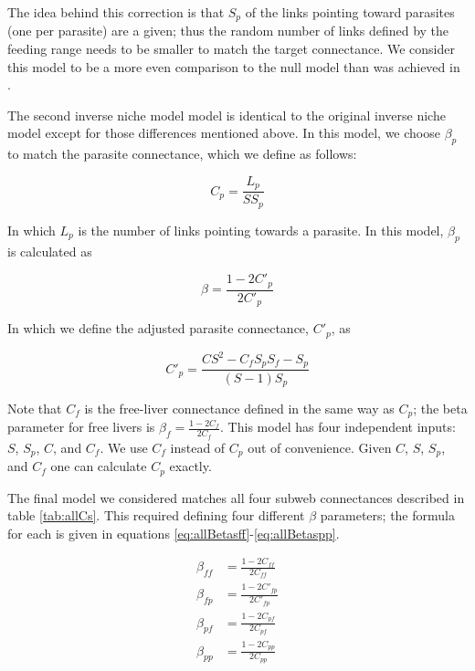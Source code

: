 \documentclass[/home/nkappler/Research/Dissertation/
 dissertation.tex]{subfiles}
\begin{document}
\begin{bibunit}
The idea behind this correction is that $S_p$ of the links pointing toward
parasites (one per parasite) are a given; thus the random number of links
defined by the feeding range needs to be smaller to match the target
connectance. We consider this model to be a more even comparison to the null
model than was achieved in \cite{Warren2010}.

The second inverse niche model model is identical to the original inverse niche
model except for those differences mentioned above. In this model, we choose
$\beta_p$ to match the parasite connectance, which we define as follows:

\begin{equation}
    C_{p} = \frac{L_{ p}}{SS_p}\label{eq:Cf}
\end{equation}

In which $L_{p}$ is the number of links pointing towards a parasite. In
this model, $\beta_p$ is calculated as

\begin{equation}
    \beta = \frac{1-2C'_{ p}}{2C'_{ p}}\label{eq:beta2}
\end{equation}

In which we define the adjusted parasite connectance, $C'_{ p}$, as

\begin{equation}
    C'_{ p}=\frac{CS^2 - C_{ f}S_pS_f - S_p}{(S-1)S_p}\label{eq:CpAdj}
\end{equation}

Note that $C_{ f}$  is the free-liver connectance defined in the same way as
$C_{ p}$; the beta parameter for free livers is $\beta_f=\frac{1-2C_f}{2C_f}$.
This model has four independent inputs: $S$, $S_p$, $C$, and $C_f$. We use
$C_f$ instead of $C_p$ out of convenience. Given $C$, $S$, $S_p$, and $C_f$ one
can calculate $C_p$ exactly.

The final model we considered matches all four subweb connectances described in
table \ref{tab:allCs}. This required defining four different $\beta$
parameters; the formula for each is given in equations
\ref{eq:allBetasff}-\ref{eq:allBetaspp}.

\begin{align}
    \beta_{f\!f} &= \frac{1-2C_{f\!f}}{2C_{f\!f}}\label{eq:allBetasff}\\
    \beta_{f\!p} &= \frac{1-2C'_{f\!p}}{2C'_{f\!p}}\\
    \beta_{p\!f} &= \frac{1-2C_{p\!f}}{2C_{p\!f}}\\
    \beta_{pp} &= \frac{1-2C_{pp}}{2C_{pp}}\label{eq:allBetaspp}
\end{align}


\end{bibunit}
\end{document}
